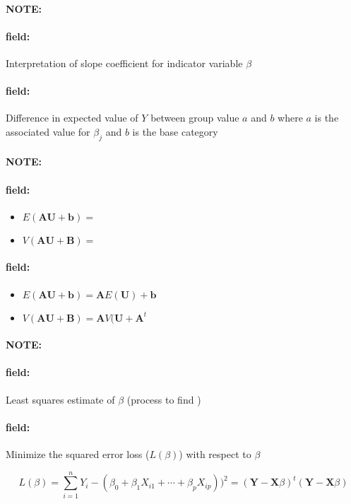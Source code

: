 \documentclass[12pt]{article}
\newenvironment{note}{\paragraph{NOTE:}}{}
\newenvironment{field}{\paragraph{field:}}{}
\begin{document}
\begin{note}
  \begin{field}
    Interpretation of slope coefficient for indicator variable $\beta$
  \end{field}
  \begin{field}
    Difference in expected value of $Y$ between group value $a$ and $b$ where $a$ is the associated value for $\beta_j$ and $b$ is the base category
  \end{field}
\end{note}

\begin{note}
  \begin{field}
    \begin{itemize}
      \item $E(\textbf{AU} + \textbf{b}) = $
      \item $V(\mathbf{AU + \mathbf{B}}) = $
    \end{itemize}
  \end{field}
  \begin{field}
    \begin{itemize}
      \item $E(\textbf{AU} + \textbf{b}) = \mathbf{A} E(\mathbf{U}) + \mathbf{b}$
      \item $V(\mathbf{AU + \mathbf{B}}) = \mathbf{A}V(\mathbf{U}+ \mathbf{A}^t$
    \end{itemize}
  \end{field}
\end{note}


\begin{note}
  \begin{field}
    Least squares estimate of $\beta$ (process to find )
  \end{field}
  \begin{field}
    Minimize the squared error loss ($L(\beta)$) with respect to $\beta$

      $$ L(\beta ) = \sum_{i=1}^n Y_i - (\beta_0 + \beta_1 X_{i1} + \cdots + \beta_p X_{ip}))^2 = (\mathbf{Y} - \mathbf{X}\beta)^t(\mathbf{Y} - \mathbf{X}\beta)$$
  \end{field}
\end{note}
\end{document}
